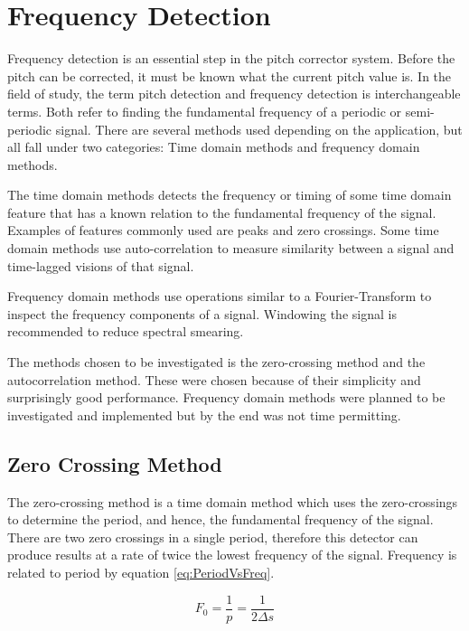 \section{Frequency Detection}

Frequency detection is an essential step in the pitch corrector system. Before the
pitch can be corrected, it must be known what the current pitch value is. In the
field of study, the term pitch detection and frequency detection is
interchangeable terms. Both refer to finding the fundamental frequency of a
periodic or semi-periodic signal\cite{ComparitivePitch}. There are several methods
used depending on the application, but all fall under two categories: Time domain
methods and frequency domain methods\cite{PDABook}.

The time domain methods detects the frequency or timing of some time domain
feature that has a known relation to the fundamental frequency of the signal.
Examples of features commonly used are peaks and zero crossings. Some time domain
methods use auto-correlation to measure similarity between a signal and
time-lagged visions of that signal\cite{PDABook}.

Frequency domain methods use operations similar to a Fourier-Transform to inspect
the frequency components of a signal. Windowing the signal is recommended to
reduce spectral smearing\cite{Windowing}.

The methods chosen to be investigated is the zero-crossing method and the
autocorrelation method. These were chosen because of their simplicity and
surprisingly good performance\cite{ComparitivePitch}. Frequency domain methods
were planned to be investigated and implemented but by the end was not time
permitting.

\subsection{Zero Crossing Method}

The zero-crossing method is a time domain method which uses the zero-crossings to
determine the period, and hence, the fundamental frequency of the signal. There
are two zero crossings in a single period, therefore this detector can produce
results at a rate of twice the lowest frequency of the signal. Frequency is
related to period by equation \ref{eq:PeriodVsFreq}.

\begin{equation}\label{eq:PeriodVsFreq}
	F_0 = \frac{1}{p} = \frac{1}{2\Delta s}
\end{equation}

